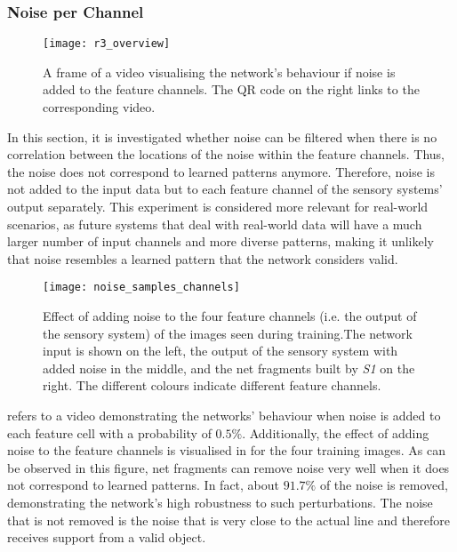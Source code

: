 \subsubsection{Noise per Channel}
%
\begin{figure}[h]
    \centering
    \texttt{[image: r3\_overview]}
    \caption[Video visualising the network's behaviour with noise in the feature channels]{A frame of a video visualising the network's behaviour if noise is added to the feature channels. The QR code on the right links to the corresponding video.}
\end{figure}
%
In this section, it is investigated whether noise can be filtered when there is no correlation between the locations of the noise within the feature channels.
Thus, the noise does not correspond to learned patterns anymore.
Therefore, noise is not added to the input data but to each feature channel of the sensory systems' output separately.
This experiment is considered more relevant for real-world scenarios, as future systems that deal with real-world data will have a much larger number of input channels and more diverse patterns, making it unlikely that noise resembles a learned pattern that the network considers valid.

\begin{figure}[h]
    \centering
    \texttt{[image: noise\_samples\_channels]}
    \caption[Effect of adding noise to the feature channels]{Effect of adding noise to the four feature channels (i.e. the output of the sensory system) of the images seen during training.The network input is shown on the left, the output of the sensory system with added noise in the middle, and the net fragments built by \emph{S1} on the right. The different colours indicate different feature channels.}
\end{figure}
%
 refers to a video demonstrating the networks' behaviour when noise is added to each feature cell with a probability of $0.5\%$.
Additionally, the effect of adding noise to the feature channels is visualised in  for the four training images.
As can be observed in this figure, net fragments can remove noise very well when it does not correspond to learned patterns.
In fact, about $91.7\%$ of the noise is removed, demonstrating the network's high robustness to such perturbations.
The noise that is not removed is the noise that is very close to the actual line and therefore receives support from a valid object.

